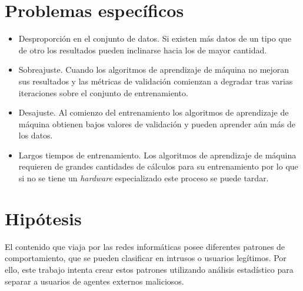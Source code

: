 \section*{Problemas específicos}
\begin{itemize}
    \item Desproporción en el conjunto de datos. Si existen más datos de un tipo que de otro los resultados pueden inclinarse hacia los de mayor cantidad.
    \item Sobreajuste. Cuando los algoritmos de aprendizaje de máquina no mejoran sus resultados y las métricas de validación comienzan a degradar tras varias iteraciones sobre el conjunto de entrenamiento.
    \item Desajuste. Al comienzo del entrenamiento los algoritmos de aprendizaje de máquina obtienen bajos valores de validación y pueden aprender aún más de los datos.
    \item Largos tiempos de entrenamiento. Los algoritmos de aprendizaje de máquina requieren de grandes cantidades de cálculos para su entrenamiento por lo que si no se tiene un \textit{hardware} especializado este proceso se puede tardar.
\end{itemize}

\section*{Hipótesis}
El contenido que viaja por las redes informáticas posee diferentes patrones de comportamiento, que se pueden clasificar en intrusos o usuarios legítimos. Por ello, este trabajo intenta crear estos patrones utilizando análisis estadístico para separar a usuarios de agentes externos maliciosos.

